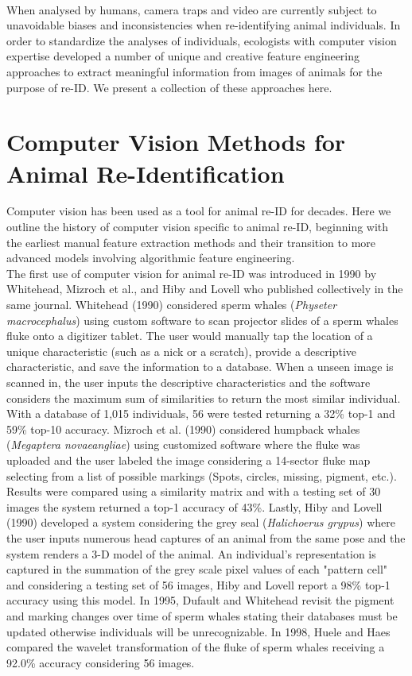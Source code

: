 \documentclass[11pt]{article}
\begin{document}
\newline
\\
When analysed by humans, camera traps and video are currently subject to unavoidable biases and inconsistencies when re-identifying animal individuals. In order to standardize the analyses of individuals, ecologists with computer vision expertise developed a number of unique and creative feature engineering approaches to extract meaningful information from images of animals for the purpose of re-ID. We present a collection of these approaches here. 

\section*{Computer Vision Methods for Animal Re-Identification}

Computer vision has been used as a tool for animal re-ID for decades. Here we outline the history of computer vision specific to animal re-ID, beginning with the earliest manual feature extraction methods and their transition to more advanced models involving algorithmic feature engineering.  
\newline
\\
The first use of computer vision for animal re-ID was introduced in 1990 by Whitehead, Mizroch et al., and Hiby and Lovell who published collectively in the same journal. Whitehead (1990) considered sperm whales (\textit{Physeter macrocephalus}) using custom software to scan projector slides of a sperm whales fluke onto a digitizer tablet. The user would manually tap the location of a unique characteristic (such as a nick or a scratch), provide a descriptive characteristic, and save the information to a database. When a unseen image is scanned in, the user inputs the descriptive characteristics and the software considers the maximum sum of similarities to return the most similar individual. With a database of 1,015 individuals, 56 were tested returning a 32\% top-1 and 59\% top-10 accuracy. Mizroch et al. (1990) considered humpback whales (\textit{Megaptera novaeangliae}) using customized software where the fluke was uploaded and the user labeled the image considering a 14-sector fluke map selecting from a list of possible markings (Spots, circles, missing, pigment, etc.). Results were compared using a similarity matrix and with a testing set of 30 images the system returned a top-1 accuracy of 43\%. Lastly, Hiby and Lovell (1990) developed a system considering the grey seal (\textit{Halichoerus grypus}) where the user inputs numerous head captures of an animal from the same pose and the system renders a 3-D model of the animal. An individual's representation is captured in the summation of the grey scale pixel values of each "pattern cell" and considering a testing set of 56 images, Hiby and Lovell report a 98\% top-1 accuracy using this model. In 1995, Dufault and Whitehead revisit the pigment and marking changes over time of sperm whales stating their databases must be updated otherwise individuals will be unrecognizable. In 1998, Huele and Haes compared the wavelet transformation of the fluke of sperm whales receiving a 92.0\% accuracy considering 56 images. 
\end{document}
